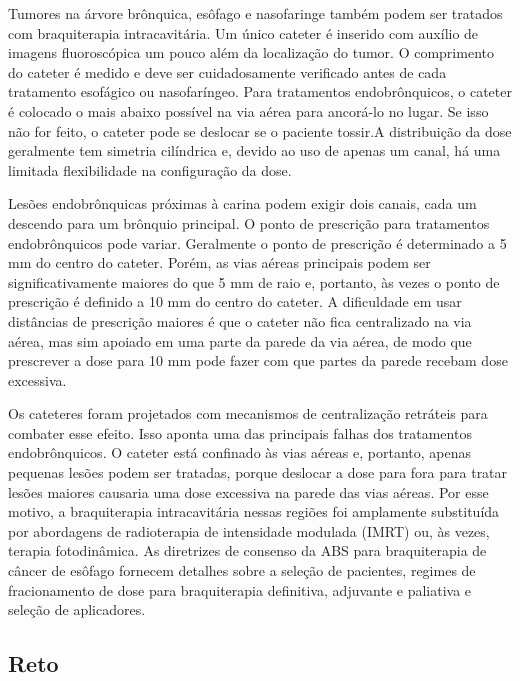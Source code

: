 \documentclass[11pt,a4paper]{article}
\begin{document}
	Tumores na árvore brônquica, esôfago e nasofaringe também podem ser tratados com braquiterapia intracavitária. Um único cateter é inserido com auxílio de imagens fluoroscópica um pouco além da localização do tumor. O comprimento do cateter é medido e deve ser cuidadosamente verificado antes de cada tratamento esofágico ou nasofaríngeo. Para tratamentos endobrônquicos, o cateter é colocado o mais abaixo possível na via aérea para ancorá-lo no lugar. Se isso não for feito, o cateter pode se deslocar se o paciente tossir.A distribuição da dose geralmente tem simetria cilíndrica e, devido ao uso de apenas um canal, há uma limitada flexibilidade na configuração da dose. 
	
	Lesões endobrônquicas próximas à carina podem exigir dois canais, cada um descendo para um brônquio principal. O ponto de prescrição para tratamentos endobrônquicos pode variar. Geralmente o ponto de prescrição é determinado a 5 mm do centro do cateter. Porém, as vias aéreas principais podem ser significativamente maiores do que 5 mm de raio e, portanto, às vezes o ponto de prescrição é definido a 10 mm do centro do cateter. A dificuldade em usar distâncias de prescrição maiores é que o cateter não fica centralizado na via aérea, mas sim apoiado em uma parte da parede da via aérea, de modo que prescrever a dose para 10 mm pode fazer com que partes da parede recebam dose excessiva.

	Os cateteres foram projetados com mecanismos de centralização retráteis para combater esse efeito. Isso aponta uma das principais falhas dos tratamentos endobrônquicos. O cateter está confinado às vias aéreas e, portanto, apenas pequenas lesões podem ser tratadas, porque deslocar a dose para fora para tratar lesões maiores causaria uma dose excessiva na parede das vias aéreas. Por esse motivo, a braquiterapia intracavitária nessas regiões foi amplamente substituída por abordagens de radioterapia de intensidade modulada (IMRT) ou, às vezes, terapia fotodinâmica. As diretrizes de consenso da ABS para braquiterapia de câncer de esôfago fornecem detalhes sobre a seleção de pacientes, regimes de fracionamento de dose para braquiterapia definitiva, adjuvante e paliativa e seleção de aplicadores.

\subsection{Reto}
\end{document}
